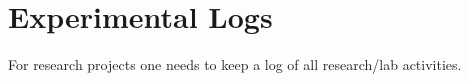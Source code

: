 
\chapter{Experimental Logs}

For research projects one needs to keep a log of all research/lab activities.   






